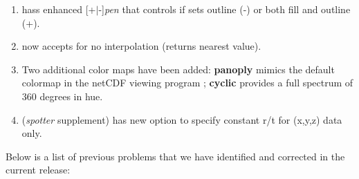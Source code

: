 \begin{enumerate}
\item {} hass enhanced [+$|$-]\emph{pen} that controls if  sets outline (-)
or both fill and outline (+).
\item {} now accepts  for no interpolation (returns nearest value).
\item Two additional color maps have been added: \textbf{panoply} mimics the default colormap in
the netCDF viewing program ; \textbf{cyclic} provides a full spectrum of 360 degrees
in hue.
\item {} (\emph{spotter} supplement) has new option  to specify constant r/t for (x,y,z) data only.
\end{enumerate}

Below is a list of previous problems that we have identified and corrected in the current release:
